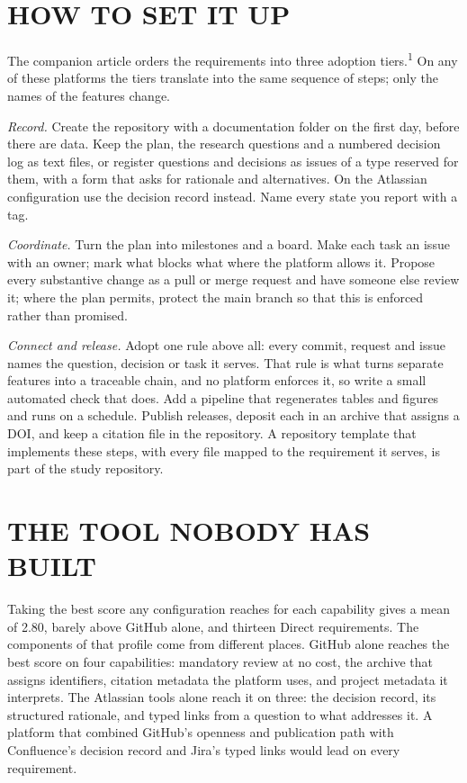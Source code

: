 \documentclass{IEEEcsmag}
\begin{document}
\section{HOW TO SET IT UP}

The companion article orders the requirements into three adoption tiers.\textsuperscript{1} On any of these platforms the tiers translate into the same sequence of steps; only the names of the features change.

\emph{Record.} Create the repository with a documentation folder on the first day, before there are data. Keep the plan, the research questions and a numbered decision log as text files, or register questions and decisions as issues of a type reserved for them, with a form that asks for rationale and alternatives. On the Atlassian configuration use the decision record instead. Name every state you report with a tag.

\emph{Coordinate.} Turn the plan into milestones and a board. Make each task an issue with an owner; mark what blocks what where the platform allows it. Propose every substantive change as a pull or merge request and have someone else review it; where the plan permits, protect the main branch so that this is enforced rather than promised.

\emph{Connect and release.} Adopt one rule above all: every commit, request and issue names the question, decision or task it serves. That rule is what turns separate features into a traceable chain, and no platform enforces it, so write a small automated check that does. Add a pipeline that regenerates tables and figures and runs on a schedule. Publish releases, deposit each in an archive that assigns a DOI, and keep a citation file in the repository. A repository template that implements these steps, with every file mapped to the requirement it serves, is part of the study repository.

\section{THE TOOL NOBODY HAS BUILT}

Taking the best score any configuration reaches for each capability gives a mean of 2.80, barely above GitHub alone, and thirteen Direct requirements. The components of that profile come from different places. GitHub alone reaches the best score on four capabilities: mandatory review at no cost, the archive that assigns identifiers, citation metadata the platform uses, and project metadata it interprets. The Atlassian tools alone reach it on three: the decision record, its structured rationale, and typed links from a question to what addresses it. A platform that combined GitHub's openness and publication path with Confluence's decision record and Jira's typed links would lead on every requirement.
\end{document}
